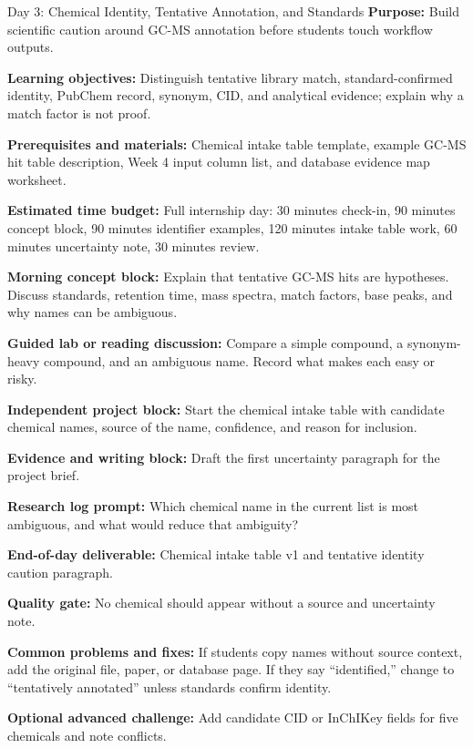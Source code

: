 \begin{dailybox}{Day 3: Chemical Identity, Tentative Annotation, and Standards}
\textbf{Purpose:} Build scientific caution around GC-MS annotation before students touch workflow outputs.

\textbf{Learning objectives:} Distinguish tentative library match, standard-confirmed identity, PubChem record, synonym, CID, and analytical evidence; explain why a match factor is not proof.

\textbf{Prerequisites and materials:} Chemical intake table template, example GC-MS hit table description, Week 4 input column list, and database evidence map worksheet.

\textbf{Estimated time budget:} Full internship day: 30 minutes check-in, 90 minutes concept block, 90 minutes identifier examples, 120 minutes intake table work, 60 minutes uncertainty note, 30 minutes review.

\textbf{Morning concept block:} Explain that tentative GC-MS hits are hypotheses. Discuss standards, retention time, mass spectra, match factors, base peaks, and why names can be ambiguous.

\textbf{Guided lab or reading discussion:} Compare a simple compound, a synonym-heavy compound, and an ambiguous name. Record what makes each easy or risky.

\textbf{Independent project block:} Start the chemical intake table with candidate chemical names, source of the name, confidence, and reason for inclusion.

\textbf{Evidence and writing block:} Draft the first uncertainty paragraph for the project brief.

\textbf{Research log prompt:} Which chemical name in the current list is most ambiguous, and what would reduce that ambiguity?

\textbf{End-of-day deliverable:} Chemical intake table v1 and tentative identity caution paragraph.

\textbf{Quality gate:} No chemical should appear without a source and uncertainty note.

\textbf{Common problems and fixes:} If students copy names without source context, add the original file, paper, or database page. If they say ``identified,'' change to ``tentatively annotated'' unless standards confirm identity.

\textbf{Optional advanced challenge:} Add candidate CID or InChIKey fields for five chemicals and note conflicts.
\end{dailybox}

